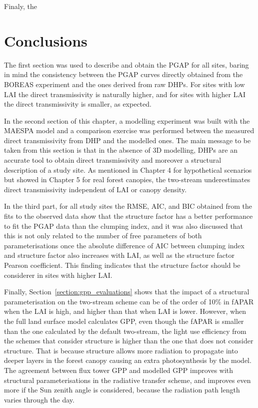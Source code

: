 \documentclass[a4paper,11pt]{report}
\begin{document}
Finaly, the 





\section{Conclusions}

The first section was used to describe and obtain the PGAP for all sites, baring in mind the consistency between the PGAP curves directly obtained from the BOREAS experiment and the ones derived from raw DHPs. For sites with low LAI the direct transmissivity is naturally higher, and for sites with higher LAI the direct transmissivity is smaller, as expected.

In the second section of this chapter, a modelling experiment was built with the MAESPA model and a comparison exercise was performed between the measured direct transmissivity from DHP and the modelled ones. The main message to be taken from this section is that in the absence of 3D modelling, DHPs are an accurate tool to obtain direct transmissivity and moreover a structural description of a study site. As mentioned in Chapter 4 for hypothetical scenarios but showed in Chapter 5 for real forest canopies, the two-stream underestimates direct transmissivity independent of LAI or canopy density.

In the third part, for all study sites the RMSE, AIC, and BIC obtained from the fits to the observed data show that the structure factor has a better performance to fit the PGAP data than the clumping index, and it was also discussed that this is not only related to the number of free parameters of both parameterisations once the absolute difference of AIC between clumping index and structure factor also increases with LAI, as well as the structure factor Pearson coefficient. This finding indicates that the structure factor should be considerer in sites with higher LAI.

Finally, Section~\ref{section:gpp_evaluations} shows that the impact of a structural parameterisation on the two-stream scheme can be of the order of 10\% in fAPAR when the LAI is high, and higher than that when LAI is lower. However, when the full land surface model calculates GPP, even though the fAPAR is smaller than the one calculated by the default two-stream, the light use efficiency from the schemes that consider structure is higher than the one that does not consider structure. That is because structure allows more radiation to propagate into deeper layers in the forest canopy causing an extra photosynthesis by the model. The agreement between flux tower GPP and modelled GPP improves with structural parameterisations in the radiative transfer scheme, and improves even more if the Sun zenith angle is considered, because the radiation path length varies through the day. 
\end{document}
